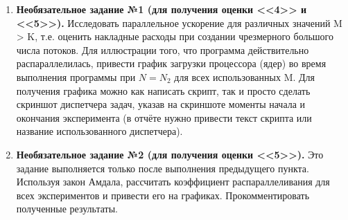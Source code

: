 \begin{enumerate}
     отчёт о проделанной работе.
		
     к устным вопросам на защите.
		
    \item\textbf{Необязательное задание №1 (для получения оценки <<4>> и <<5>>).} Исследовать параллельное ускорение для различных значений M > K, т.е. оценить накладные расходы при создании чрезмерного большого числа потоков. Для иллюстрации того, что программа действительно распараллелилась, привести график загрузки процессора (ядер) во время выполнения программы при $N = N_2$ для всех использованных M. Для получения графика можно как написать скрипт, так и просто сделать скриншот диспетчера задач, указав на скриншоте моменты начала и окончания эксперимента (в отчёте нужно привести текст скрипта или название использованного диспетчера).
		
    \item\textbf{Необязательное задание №2 (для получения оценки <<5>>).} Это задание выполняется только после выполнения предыдущего пункта. Используя закон Амдала, рассчитать коэффициент распараллеливания для всех экспериментов и привести его на графиках. Прокомментировать полученные результаты.
\end{enumerate}

